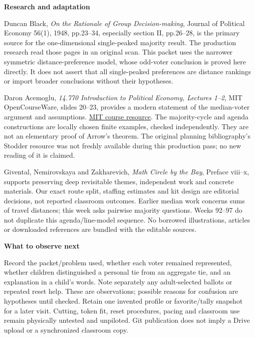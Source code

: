 \documentclass[11pt,letterpaper]{article}
\newcommand{\sub}[1]{\par\textbf{#1}\par}
\begin{document}
\sub{Research and adaptation}
Duncan Black, \emph{On the Rationale of Group Decision-making}, Journal of Political Economy 56(1), 1948, pp.23--34, especially section II, pp.26--28, is the primary source for the one-dimensional single-peaked majority result. The production research read those pages in an original scan. This packet uses the narrower symmetric distance-preference model, whose odd-voter conclusion is proved here directly. It does not assert that all single-peaked preferences are distance rankings or import broader conclusions without their hypotheses.

Daron Acemoglu, \emph{14.770 Introduction to Political Economy, Lectures 1--2}, MIT OpenCourseWare, slides 20--23, provides a modern statement of the median-voter argument and assumptions. \href{https://ocw.mit.edu/courses/14-770-introduction-to-political-economy-fall-2017/bdc7ef5c8617eaf573dc28da5c2e19ef_MIT14_770F17_lec1_2_acemoglu.pdf}{MIT course resource}. The majority-cycle and agenda constructions are locally chosen finite examples, checked independently. They are not an elementary proof of Arrow's theorem. The original planning bibliography's Stodder resource was not freshly available during this production pass; no new reading of it is claimed.

Givental, Nemirovskaya and Zakharevich, \emph{Math Circle by the Bay}, Preface viii--x, supports preserving deep revisitable themes, independent work and concrete materials. Our exact route split, staffing estimates and kit design are editorial decisions, not reported classroom outcomes. Earlier median work concerns sums of travel distances; this week asks pairwise majority questions. Weeks 92--97 do not duplicate this agenda/line-model sequence. No borrowed illustrations, articles or downloaded references are bundled with the editable sources.

\sub{What to observe next}
Record the packet/problem used, whether each voter remained represented, whether children distinguished a personal tie from an aggregate tie, and an explanation in a child's words. Note separately any adult-selected ballots or repeated reset help. These are observations; possible reasons for confusion are hypotheses until checked. Retain one invented profile or favorite/tally snapshot for a later visit. Cutting, token fit, reset procedures, pacing and classroom use remain physically untested and unpiloted. Git publication does not imply a Drive upload or a synchronized classroom copy.
\end{document}
